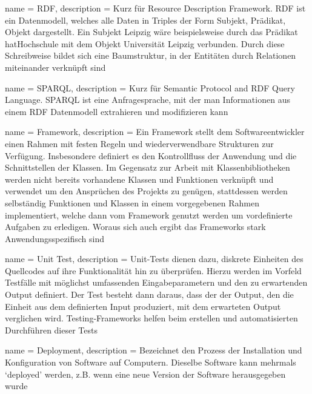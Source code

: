  {
    name = RDF,
    description = {
        Kurz für Resource Description Framework. RDF ist ein Datenmodell, 
        welches alle Daten in Triples der Form Subjekt,
        Prädikat, Objekt dargestellt. Ein Subjekt Leipzig wäre beispielsweise 
        durch das Prädikat hatHochschule mit dem Objekt Universität Leipzig 
        verbunden. Durch diese Schreibweise bildet sich eine Baumstruktur, in 
        der Entitäten durch Relationen miteinander verknüpft sind
    }
}

 {
    name = SPARQL,
    description = {
        Kurz für Semantic Protocol and RDF Query Language. SPARQL ist eine 
        Anfragesprache, mit der man Informationen aus einem RDF 
        Datenmodell extrahieren und modifizieren kann
    }
}

 {
    name = Framework,
    description = {
        Ein Framework stellt dem Softwareentwickler einen Rahmen mit festen 
        Regeln und wiederverwendbare Strukturen zur Verfügung. Insbesondere 
        definiert es den Kontrollfluss der Anwendung und die Schnittstellen der 
        Klassen. Im Gegensatz zur Arbeit mit Klassenbibliotheken werden nicht 
        bereits vorhandene Klassen und Funktionen verknüpft und verwendet um den 
        Ansprüchen des Projekts zu genügen, stattdessen werden selbständig 
        Funktionen und Klassen in einem vorgegebenen Rahmen implementiert, 
        welche dann vom Framework genutzt werden um vordefinierte Aufgaben zu 
        erledigen. Woraus sich auch ergibt das Frameworks stark 
        Anwendungsspezifisch sind
    }
}

 {
    name = Unit Test,
    description = {
        Unit-Tests dienen dazu, diskrete Einheiten des Quellcodes auf ihre 
        Funktionalität hin zu überprüfen. Hierzu werden im Vorfeld Testfälle mit 
        möglichst umfassenden Eingabeparametern und den zu erwartenden Output 
        definiert. Der Test besteht dann daraus, dass der der Output, den 
        die Einheit aus dem definierten Input produziert, mit dem erwarteten 
        Output verglichen wird. Testing-Frameworks helfen beim erstellen und 
        automatisierten Durchführen dieser Tests
    }
}

 {
    name = Deployment,
    description = {
        Bezeichnet den Prozess der Installation und Konfiguration von Software 
        auf Computern. Dieselbe Software kann mehrmals `deployed' werden, z.B. 
        wenn eine neue Version der Software herausgegeben wurde
    }
}

